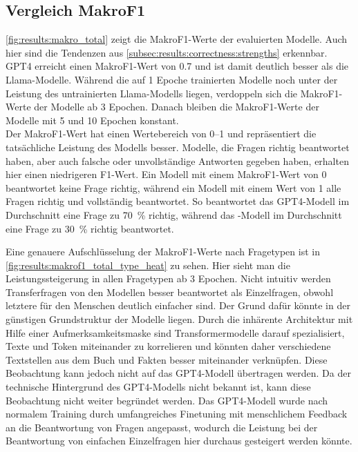 \subsection{Vergleich MakroF1}

\cref{fig:results:makro_total} zeigt die MakroF1-Werte der evaluierten Modelle.
Auch hier sind die Tendenzen aus \cref{subsec:results:correctness:strengths} erkennbar.
GPT4 erreicht einen MakroF1-Wert von \num{0.7} und ist damit deutlich besser als die Llama-Modelle.
Während die auf 1 Epoche trainierten Modelle noch unter der Leistung des untrainierten Llama-Modells liegen, verdoppeln sich die MakroF1-Werte der Modelle ab 3 Epochen.
Danach bleiben die MakroF1-Werte der Modelle mit 5 und 10 Epochen konstant.\\

Der MakroF1-Wert hat einen Wertebereich von \numrange{0}{1} und repräsentiert die tatsächliche Leistung des Modells besser.
Modelle, die Fragen richtig beantwortet haben, aber auch falsche oder unvollständige Antworten gegeben haben, erhalten hier einen niedrigeren F1-Wert.
Ein Modell mit einem MakroF1-Wert von \num{0} beantwortet keine Frage richtig, während ein Modell mit einem Wert von \num{1} alle Fragen richtig und vollständig beantwortet.
So beantwortet das GPT4-Modell im Durchschnitt eine Frage zu \SI{70}{\percent} richtig, während das \lea-Modell im Durchschnitt eine Frage zu \SI{30}{\percent} richtig beantwortet.\\


Eine genauere Aufschlüsselung der MakroF1-Werte nach Fragetypen ist in \cref{fig:results:makrof1_total_type_heat} zu sehen.
Hier sieht man die Leistungssteigerung in allen Fragetypen ab 3 Epochen.
Nicht intuitiv werden Transferfragen von den Modellen besser beantwortet als Einzelfragen, obwohl letztere für den Menschen deutlich einfacher sind.
Der Grund dafür könnte in der günstigen Grundstruktur der Modelle liegen.
Durch die inhärente Architektur mit Hilfe einer Aufmerksamkeitsmaske sind Transformermodelle darauf spezialisiert, Texte und Token miteinander zu korrelieren und könnten daher verschiedene Textstellen aus dem Buch und Fakten besser miteinander verknüpfen.
Diese Beobachtung kann jedoch nicht auf das GPT4-Modell übertragen werden.
Da der technische Hintergrund des GPT4-Modells nicht bekannt ist, kann diese Beobachtung nicht weiter begründet werden.
Das GPT4-Modell wurde nach normalem Training durch umfangreiches Finetuning mit menschlichem Feedback an die Beantwortung von Fragen angepasst, wodurch die Leistung bei der Beantwortung von einfachen Einzelfragen hier durchaus gesteigert werden könnte.\\

